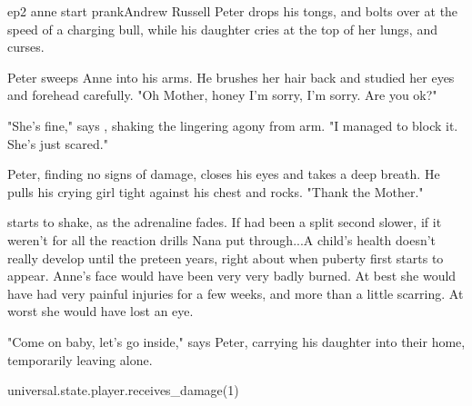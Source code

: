 \documentclass{book}
\begin{document}
\begin{childnode}{ep2 anne start prank}{Andrew Russell}
    Peter drops his tongs, and bolts over at the speed of a charging bull, while his daughter cries at the top of her lungs, and \name{} curses.

    Peter sweeps Anne into his arms. He brushes her hair back and studied her eyes and forehead carefully. "Oh Mother, honey I'm sorry, I'm sorry. Are you ok?"

    "She's fine," says \name{}, shaking the lingering agony from \hisher{} arm. "I managed to block it. She's just scared."

    Peter, finding no signs of damage, closes his eyes and takes a deep breath. He pulls his crying girl tight against his chest and rocks. "Thank the Mother."

    \name{} starts to shake, as the adrenaline fades. If \heshe{} had been a split second slower, if it weren't for all the reaction drills Nana put \himher{} through...A child's health doesn't 
    really develop until the preteen years, right about when puberty first
    starts to appear. Anne's face would have been very very badly burned. At best she would have had very painful injuries for a few weeks, and more than a little scarring. At worst she would have lost an eye. 

    "Come on baby, let's go inside," says Peter, carrying his daughter into their home, temporarily leaving \name{} alone.

    \begin{code}

        universal.state.player.receives\_damage(1)

    \end{code}



\end{childnode}
\end{document}

